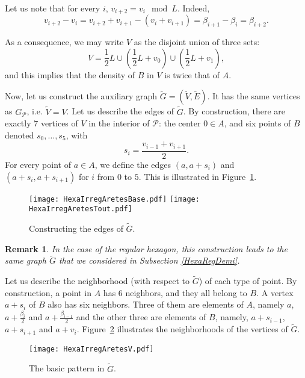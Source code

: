 \documentclass{amsart}                     %
\newtheorem{rema}{Remark}
\newcommand{\fref}[1]{Figure~\textup{\ref{#1}}}
\begin{document}
Let us note that for every $i$, $v_{i+2}= v_i \mod L $. Indeed, $$v_{i+2}-v_i=v_{i+2}+v_{i+1}-(v_i+v_{i+1})=\beta_{i+1} - \beta_i = \beta_{i+2}.$$ 

As a consequence, we may write $V$ as the disjoint union of three sets:
$$V= \frac{1}{2}L \cup (\frac{1}{2}L + v_0) \cup (\frac{1}{2}L + v_1),$$
and this implies that the density of $B$ in $V$ is twice that of $A$.

Now, let us construct the auxiliary graph $\tilde{G}=(\tilde{V},\tilde{E})$. It has the same vertices as $G_{\mathcal P}$, i.e. $\tilde{V}=V$. Let us describe the edges of $\tilde{G}$. By construction, there are exactly $7$ vertices of $V$ in the interior of $\mathcal{P}$: the center $0\in A$, and six points of $B$ denoted $s_0,\ldots,s_5$, with
$$s_i=\frac{v_{i-1}+v_{i+1}}{2}.$$
For every point of $a\in A$, we define the edges $(a,a+s_i)$ and $(a+s_i, a+s_{i+1})$ for $i$ from $0$ to $5$. This is illustrated in \fref{HexaIrregAretes}.

\begin{figure}[!ht]
\texttt{[image: HexaIrregAretesBase.pdf]} \hspace{1.5cm}
\texttt{[image: HexaIrregAretesTout.pdf]} 
\caption{Constructing  the edges of $\tilde{G}$.\label{HexaIrregAretes}}
\end{figure}

\begin{rema}
In the case of the regular hexagon, this construction leads to the same graph $\tilde{G}$ that we considered in Subsection \ref{HexaRegDemi}.
\end{rema}

Let us describe the neighborhood (with respect to $\tilde{G}$) of each type of point. By construction, a point in $A$ has $6$ neighbors, and they all belong to $B$. 
A vertex $a+s_i$ of $B$ also has six neighbors. Three of them are elements of $A$, namely $a$, $a+\frac{\beta_i} 2$ and $a+\frac{\beta_{i-1}} 2$ and the other three are elements of $B$, namely, $a+s_{i-1}$, $a+s_{i+1}$ and $a+v_i$. \fref{aretesV} illustrates the neighborhoods of the vertices of $\tilde{G}$.

\begin{figure}[!ht]
\texttt{[image: HexaIrregAretesV.pdf]} \hspace{10pt}
\caption{The basic pattern in $\tilde{G}$.	\label{aretesV}}
\end{figure}
\end{document}
